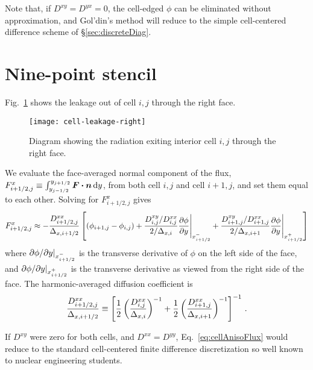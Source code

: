 Note that, if $D^{xy} = D^{yx}=0$, the cell-edged $\phi$ can be eliminated
without approximation, and
Gol'din's method will reduce to the simple cell-centered difference scheme of
\S\ref{sec:discreteDiag}.

\section{Nine-point stencil}

Fig.~\ref{fig:cellAnisoLeakage} shows the leakage out of cell $i,j$ through the
right face.
\begin{figure}[htb]
  \centering
  \texttt{[image: cell-leakage-right]}
  \caption{Diagram showing the radiation exiting interior cell $i,j$ through the
  right face.}
  \label{fig:cellAnisoLeakage}
\end{figure}
We evaluate the face-averaged normal component of the flux,
$F_{i+1/2,j}^x \equiv \int_{y_{j-1/2}}^{y_{j+1/2}} \bm{F} \bm{\cdot} \bm{n} \mathop{}\!\mathrm{d}
y$, from both cell $i,j$ and cell $i+1,j$, and set them equal to each other.
Solving for $F_{i+1/2,j}^x$ gives
\begin{equation} \label{eq:cellAnisoFlux}
  F_{i+1/2,j}^{x} \approx
  - \frac{D^{xx}_{i+1/2,j}}{\Delta_{x,i+1/2}}
  \left[ 
    \left( \phi_{i+1,j} - \phi_{i,j} \right)
  + \frac{D^{xy}_{i,j}/D^{xx}_{i,j}}{2/\Delta_{x,i}}
    \frac{\partial \phi}{\partial y} \Bigg|_{x_{i+1/2}^-}
  + \frac{D^{xy}_{i+1,j}/D^{xx}_{i+1,j}}{2/\Delta_{x,i+1}}
    \frac{\partial \phi}{\partial y} \Bigg|_{x_{i+1/2}^+}
  \right]
\end{equation}
where ${\partial \phi}/{\partial y} |_{x_{i+1/2}^-}$ is the transverse derivative of
$\phi$ on the left side of the face, and ${\partial \phi}/{\partial y} |_{x_{i+1/2}^+}$ is
the transverse derivative as viewed from the right side of the face.
The harmonic-averaged diffusion coefficient is
\begin{equation} \tagref{eq:cellEdgeDHarmonic}
  \frac{D^{xx}_{i+1/2,j}}{\Delta_{x,i+1/2}} \equiv \left[
  \frac12 \left( \frac{D^{xx}_{i,j}}{\Delta_{x,i}} \right)\inv
 + \frac12 \left( \frac{D^{xx}_{i+1,j}}{\Delta_{x,i+1}} \right)\inv
  \right]\inv\,.
\end{equation}

If $D^{xy}$ were zero for both cells, and $D^{xx}=D^{yy}$,
Eq.~\eqref{eq:cellAnisoFlux} would reduce to
the standard cell-centered finite difference discretization so well known to
nuclear engineering students.

